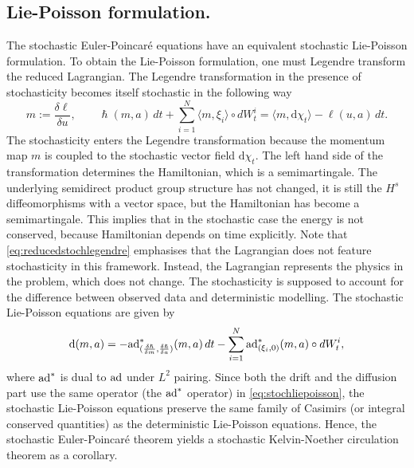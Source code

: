 \documentclass[11pt, oneside]{article}   	%
\numberwithin{equation}{section}
\theoremstyle{plain}
\theoremstyle{definition}
\theoremstyle{remark}
\newcommand{\<}{\langle}
\renewcommand{\>}{\rangle}
\def\rmd{{\mathrm{d}}}
\begin{document}
\subsection{Lie-Poisson formulation.}
The stochastic Euler-Poincar\'e equations have an equivalent stochastic Lie-Poisson formulation. To obtain the Lie-Poisson formulation, one must Legendre transform the reduced Lagrangian. The Legendre transformation  in the presence of stochasticity becomes itself stochastic in the following way
\begin{equation}
m := \frac{\delta\ell}{\delta u}, \qquad \hslash(m,a)\,dt + \sum_{i=1}^N\langle m,\xi_i\rangle \circ dW_t^i = \langle m,{\rmd}\chi_t\rangle - \ell(u,a)\,dt.
\label{eq:reducedstochlegendre}
\end{equation}
The stochasticity enters the Legendre transformation  because the momentum map  $m$ is coupled to the stochastic vector field ${\rmd}\chi_t$. The left hand side of the transformation determines the Hamiltonian, which is a semimartingale. The underlying semidirect product group structure has not changed, it is still the $H^s$ diffeomorphisms with a vector space, but the Hamiltonian has become a semimartingale. This implies that in the stochastic case the energy is not conserved, because Hamiltonian depends on time explicitly. Note that \eqref{eq:reducedstochlegendre} emphasises that the Lagrangian does not feature stochasticity in this framework. Instead, the Lagrangian represents the physics in the problem, which does not change. The stochasticity is supposed to account for the difference between observed data and deterministic modelling. The stochastic Lie-Poisson equations are given by
\begin{equation}
{\rmd}(m,a) = -{\rm ad}^*_{(\frac{\delta\hslash}{\delta m},\frac{\delta\hslash}{\delta a})}(m,a)\,dt - \sum_{i=1}^N{\rm ad}^*_{(\xi_i,0)}(m,a)\circ dW_t^i,
\label{eq:stochliepoisson}
\end{equation}
where ${\rm ad}^*$ is dual to ${\rm ad}$ under $L^2$ pairing. Since both the drift and the diffusion part use the same operator (the ${\rm ad}^*$ operator) in \eqref{eq:stochliepoisson}, the stochastic Lie-Poisson equations preserve the same family of Casimirs (or integral conserved quantities) as the deterministic Lie-Poisson equations. 
Hence, the stochastic Euler-Poincar\'e theorem yields a stochastic Kelvin-Noether circulation theorem as a corollary. 
  
\end{document}
